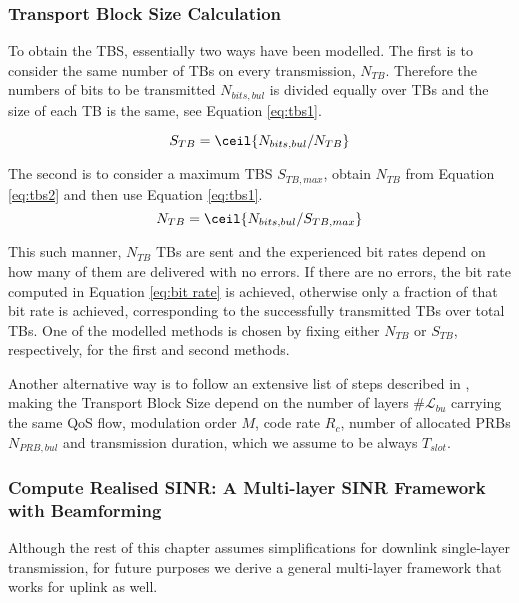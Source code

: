 \subsubsection*{Transport Block Size Calculation}

To obtain the \ac{TBS}, essentially two ways have been modelled. The first is to consider the same number of TBs on every transmission, $N_{TB}$. Therefore the numbers of bits to be transmitted $N_{bits, bul}$ is divided equally over TBs and the size of each TB is the same, see Equation \eqref{eq:tbs1}.


\begin{equation} \label{eq:tbs1}
    S_{TB} = \ceil{N_{bits, bul}/N_{TB}}    
\end{equation}

The second is to consider a maximum TBS $S_{TB, max}$, obtain $N_{TB}$ from Equation \eqref{eq:tbs2} and then use Equation \eqref{eq:tbs1}. 
\begin{equation} \label{eq:tbs2}
    N_{TB} = \ceil{N_{bits, bul}/S_{TB, max}}
\end{equation}

This such manner, $N_{TB}$ TBs are sent and the experienced bit rates depend on how many of them are delivered with no errors. If there are no errors, the bit rate computed in Equation \eqref{eq:bit rate} is achieved, otherwise only a fraction of that bit rate is achieved, corresponding to the successfully transmitted TBs over total TBs. One of the modelled methods is chosen by fixing either $N_{TB}$ or $S_{TB}$, respectively, for the first and second methods.

Another alternative way is to follow an extensive list of steps described in \cite{3gpp-codebooks}, making the Transport Block Size depend on the number of layers $\#\mathcal{L}_{bu}$ carrying the same QoS flow, modulation order $M$, code rate $R_c$, number of allocated PRBs $N_{PRB, bul}$ and transmission duration, which we assume to be always $T_{slot}$.


\subsubsection*{Compute Realised SINR: A Multi-layer SINR Framework with Beamforming}
\label{sec:sinr_framework}

Although the rest of this chapter assumes simplifications for downlink  single-layer transmission, for future purposes we derive a general multi-layer framework that works for uplink as well. 

